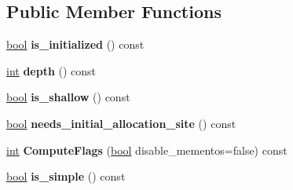 \subsection*{Public Member Functions}
\begin{DoxyCompactItemize}
\item 
\mbox{\label{classv8_1_1internal_1_1AggregateLiteral_af89e700cae2a8af5a8408048a5e97d07}} 
\mbox{\hyperlink{classbool}{bool}} {\bfseries is\+\_\+initialized} () const
\item 
\mbox{\label{classv8_1_1internal_1_1AggregateLiteral_a9ca53fd750ca800268a4ea92a6ca3287}} 
\mbox{\hyperlink{classint}{int}} {\bfseries depth} () const
\item 
\mbox{\label{classv8_1_1internal_1_1AggregateLiteral_a6ccaff2cb289811cc47eb6fe188728de}} 
\mbox{\hyperlink{classbool}{bool}} {\bfseries is\+\_\+shallow} () const
\item 
\mbox{\label{classv8_1_1internal_1_1AggregateLiteral_ae6f6fa2d0bab943685ac44d9b98b3f0d}} 
\mbox{\hyperlink{classbool}{bool}} {\bfseries needs\+\_\+initial\+\_\+allocation\+\_\+site} () const
\item 
\mbox{\label{classv8_1_1internal_1_1AggregateLiteral_aab431fb4280c3c3e07251be93650e8c4}} 
\mbox{\hyperlink{classint}{int}} {\bfseries Compute\+Flags} (\mbox{\hyperlink{classbool}{bool}} disable\+\_\+mementos=false) const
\item 
\mbox{\label{classv8_1_1internal_1_1AggregateLiteral_ae91f5d0a9a11196b255de90aab34ae9d}} 
\mbox{\hyperlink{classbool}{bool}} {\bfseries is\+\_\+simple} () const
\end{DoxyCompactItemize}
